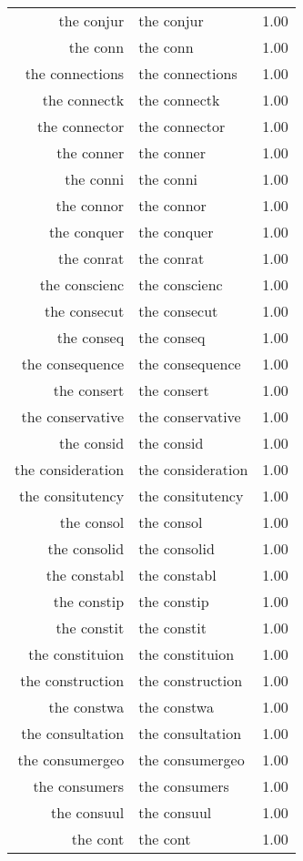 \begin{table}[ht]
\begin{tabular}{rlr}
  the conjur & the conjur & 1.00 \\ 
  the conn & the conn & 1.00 \\ 
  the connections & the connections & 1.00 \\ 
  the connectk & the connectk & 1.00 \\ 
  the connector & the connector & 1.00 \\ 
  the conner & the conner & 1.00 \\ 
  the conni & the conni & 1.00 \\ 
  the connor & the connor & 1.00 \\ 
  the conquer & the conquer & 1.00 \\ 
  the conrat & the conrat & 1.00 \\ 
  the conscienc & the conscienc & 1.00 \\ 
  the consecut & the consecut & 1.00 \\ 
  the conseq & the conseq & 1.00 \\ 
  the consequence & the consequence & 1.00 \\ 
  the consert & the consert & 1.00 \\ 
  the conservative & the conservative & 1.00 \\ 
  the consid & the consid & 1.00 \\ 
  the consideration & the consideration & 1.00 \\ 
  the consitutency & the consitutency & 1.00 \\ 
  the consol & the consol & 1.00 \\ 
  the consolid & the consolid & 1.00 \\ 
  the constabl & the constabl & 1.00 \\ 
  the constip & the constip & 1.00 \\ 
  the constit & the constit & 1.00 \\ 
  the constituion & the constituion & 1.00 \\ 
  the construction & the construction & 1.00 \\ 
  the constwa & the constwa & 1.00 \\ 
  the consultation & the consultation & 1.00 \\ 
  the consumergeo & the consumergeo & 1.00 \\ 
  the consumers & the consumers & 1.00 \\ 
  the consuul & the consuul & 1.00 \\ 
  the cont & the cont & 1.00 \\ 

\end{tabular}
\end{table}
